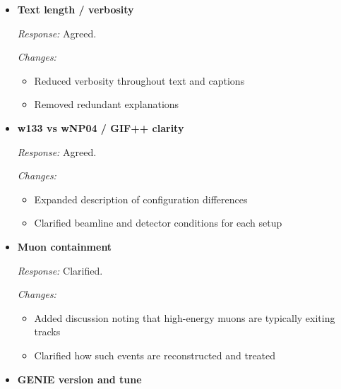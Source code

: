 \documentclass[11pt]{article}
\begin{document}
\begin{itemize}[leftmargin=*]
\textit{Response:} Agreed.

\textit{Changes:}
\begin{itemize}
\item Introduced total data exposure in POT in the Introduction
\item Normalized MC to corresponding POT
\item Updated plots to include POT normalization
\item Retained ``week'' normalization only in captions where appropriate \textcolor{red}{It is missing to add also there the equivalent POT as requested}
\end{itemize}

\item \textbf{Text length / verbosity}

\textit{Response:} Agreed.

\textit{Changes:}
\begin{itemize}
\item Reduced verbosity throughout text and captions
\item Removed redundant explanations
\end{itemize}

\item \textbf{w133 vs wNP04 / GIF++ clarity}

\textit{Response:} Agreed.

\textit{Changes:}
\begin{itemize}
\item Expanded description of configuration differences
\item Clarified beamline and detector conditions for each setup
\end{itemize}

\item \textbf{Muon containment}

\textit{Response:} Clarified.

\textit{Changes:}
\begin{itemize}
\item Added discussion noting that high-energy muons are typically exiting tracks
\item Clarified how such events are reconstructed and treated
\end{itemize}

\item \textbf{GENIE version and tune}


\end{itemize}
\end{document}
